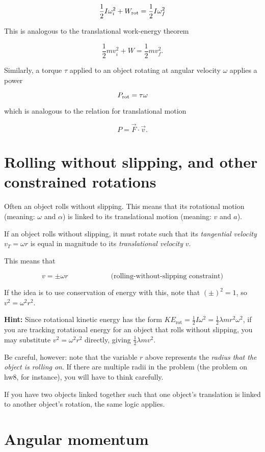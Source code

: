 \documentclass[10pt]{article}
\begin{document}
$$\frac{1}{2}I\omega_i^2 + W_{\rm rot} = \frac{1}{2}I\omega_f^2$$

This is analogous to the translational work-energy theorem

$$\frac{1}{2}mv_i^2 + W = \frac{1}{2}mv_f^2.$$

Similarly, a torque $\tau$ applied to an object rotating at angular velocity $\omega$ applies a power 

$$P_{\rm rot} = \tau \omega$$

which is analogous to the relation for translational motion

$$P=\vec F \cdot \vec v.$$

\section{Rolling without slipping, and other constrained rotations}

Often an object rolls without slipping. This means that its rotational motion (meaning: $\omega$ and $\alpha$) is linked to its translational motion (meaning: $v$ and $a$).

If an object rolls without slipping, it must rotate such that its {\it tangential velocity} $v_T = \omega r$ is equal in magnitude to its {\it translational velocity} $v$.

This means that 

$$ v = \pm \omega r \hspace{1in} \text{(rolling-without-slipping constraint)} $$

If the idea is to use conservation of energy with this, note that $(\pm)^2 = 1$, so $v^2 = \omega^2 r^2$.

{\bf Hint:} Since rotational kinetic energy has the form $KE_{\text{rot}} = \frac{1}{2}I\omega^2 = \frac{1}{2}\lambda mr^2 \omega^2$, if you are tracking 
rotational energy for an object that rolls without slipping, you may substitute $v^2 = \omega^2 r^2$ directly, giving $\frac{1}{2}\lambda mv^2$.

Be careful, however: note that the variable $r$ above represents the {\it radius that the object is rolling on}. If there are multiple radii in the problem (the problem on hw8, for instance), you will have to think carefully.

If you have two objects linked together such that one object's translation is linked to another object's rotation, the same logic applies.

\section{Angular momentum}
\end{document}
